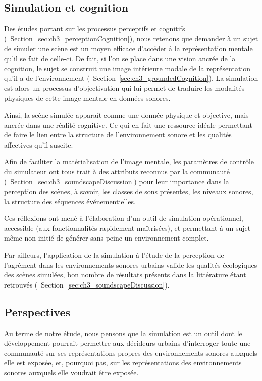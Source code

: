 \subsection{Simulation et cognition}

Des études portant sur les processus perceptifs et cognitifs (\cf~Section~\ref{sec:ch3_perceptionCognition}), nous retenons que demander à un sujet de simuler une scène est un moyen efficace d'accéder à la représentation mentale qu'il se fait de celle-ci. De fait, si l'on se place dans une vision ancrée de la cognition, le sujet se construit une image intérieure modale de la représentation qu'il a de l'environnement (\cf~Section~\ref{sec:ch3_groundedCognition}). La simulation est alors un processus d'objectivation qui lui permet de traduire les modalités physiques de cette image mentale en données sonores.

Ainsi, la scène simulée apparaît comme une donnée physique et objective, mais ancrée dans une réalité cognitive. Ce qui en fait une ressource idéale permettant de faire le lien entre la structure de l'environnement sonore et les qualités affectives qu'il suscite.

Afin de faciliter la matérialisation de l'image mentale, les paramètres de contrôle du simulateur ont tous trait à des attributs reconnus par la communauté (\cf~Section~\ref{sec:ch3_soundscapeDiscussion}) pour leur importance dans la perception des scènes, à savoir, les classes de sons présentes, les niveaux sonores, la structure des séquences événementielles.

Ces réflexions ont mené à l'élaboration d'un outil de simulation opérationnel, accessible (aux fonctionnalités rapidement maîtrisées), et permettant à un sujet même non-initié de générer sans peine un environnement complet.

Par ailleurs, l'application de la simulation à l’étude de la perception de l'agrément dans les environnements sonores urbains valide les qualités écologiques des scènes simulées, bon nombre de résultats présents dans la littérature étant retrouvés (\cf~Section~\ref{sec:ch3_soundscapeDiscussion}).

\subsection{Perspectives}

Au terme de notre étude, nous pensons que la simulation est un outil dont le développement pourrait permettre aux décideurs urbains d'interroger toute une communauté sur ses représentations propres des environnements sonores auxquels elle est exposée, et, pourquoi pas, sur les représentations des environnements sonores auxquels elle voudrait être exposée.

